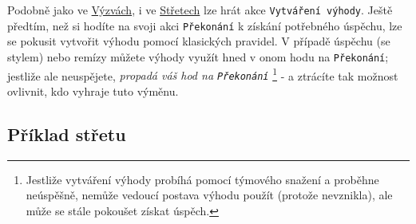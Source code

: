 \documentclass[../main.tex]{subfiles}
\begin{document}
Podobně jako ve \underline{Výzvách}, i ve \underline{Střetech} lze hrát akce \texttt{Vytváření výhody}. Ještě předtím, než si hodíte na svoji akci \texttt{Překonání} k získání potřebného úspěchu, lze se pokusit vytvořit výhodu pomocí klasických pravidel. V případě úspěchu (se stylem) nebo remízy můžete výhody využít hned v onom hodu na \texttt{Překonání}; jestliže ale neuspějete, \textit{propadá váš hod na \texttt{Překonání}} \footnote{Jestliže vytváření výhody probíhá pomocí týmového snažení a proběhne neúspěšně, nemůže vedoucí postava výhodu použít (protože nevznikla), ale může se stále pokoušet získat úspěch.} - a ztrácíte tak možnost ovlivnit, kdo vyhraje tuto výměnu.

\subsection{Příklad střetu}
\label{sec:příklad-střet}
\end{document}
